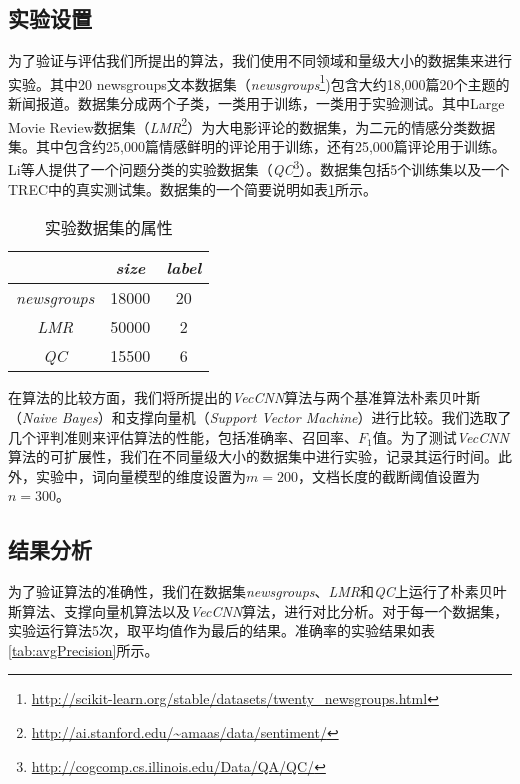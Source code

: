\subsection{实验设置}
\label{subsec3:settings}
为了验证与评估我们所提出的算法，我们使用不同领域和量级大小的数据集来进行实验。其中20 newsgroups文本数据集（\textit{newsgroups}\footnote{\url{http://scikit-learn.org/stable/datasets/twenty_newsgroups.html}})包含大约18,000篇20个主题的新闻报道。数据集分成两个子类，一类用于训练，一类用于实验测试。其中Large Movie Review数据集（\textit{LMR}\footnote{\url{http://ai.stanford.edu/~amaas/data/sentiment/}}）为大电影评论的数据集，为二元的情感分类数据集。其中包含约25,000篇情感鲜明的评论用于训练，还有25,000篇评论用于训练。Li等人提供了一个问题分类的实验数据集（\textit{QC}\footnote{\url{http://cogcomp.cs.illinois.edu/Data/QA/QC/}}）。数据集包括5个训练集以及一个TREC中的真实测试集。数据集的一个简要说明如表\ref{tab:datasetCNN}所示。

\begin{table}
    \centering
    \caption{实验数据集的属性}\label{tab:datasetCNN}
    \begin{tabular}{ccc}
        \hline
         & \textit{size} & \textit{label}\\
        \hline
        \textit{newsgroups} & 18000 & 20\\
        \hline
        \textit{LMR} & 50000 & 2\\
        \hline
        \textit{QC} & 15500 & 6\\
        \hline
    \end{tabular}
\end{table}

在算法的比较方面，我们将所提出的\textit{VecCNN}算法与两个基准算法朴素贝叶斯（\textit{Naive Bayes}）和支撑向量机（\textit{Support Vector Machine}）进行比较。我们选取了几个评判准则来评估算法的性能，包括准确率、召回率、$F_1$值。为了测试\textit{VecCNN}算法的可扩展性，我们在不同量级大小的数据集中进行实验，记录其运行时间。此外，实验中，词向量模型的维度设置为$m=200$，文档长度的截断阈值设置为$n=300$。

\subsection{结果分析}
\label{subsec3:analysis}
为了验证算法的准确性，我们在数据集\textit{newsgroups}、\textit{LMR}和\textit{QC}上运行了朴素贝叶斯算法、支撑向量机算法以及\textit{VecCNN}算法，进行对比分析。对于每一个数据集，实验运行算法5次，取平均值作为最后的结果。准确率的实验结果如表\ref{tab:avgPrecision}所示。

